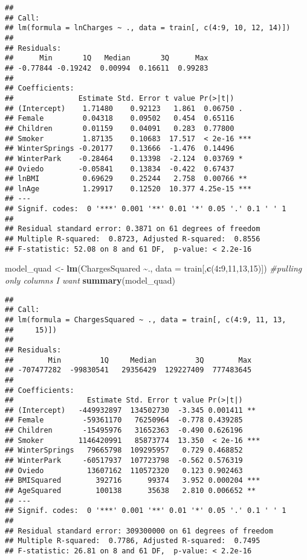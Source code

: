 \documentclass[
]{article}
\newenvironment{Shaded}{\begin{snugshade}}{\end{snugshade}}
\newcommand{\AttributeTok}[1]{\textcolor[rgb]{0.13,0.29,0.53}{#1}}
\newcommand{\CommentTok}[1]{\textcolor[rgb]{0.56,0.35,0.01}{\textit{#1}}}
\newcommand{\DecValTok}[1]{\textcolor[rgb]{0.00,0.00,0.81}{#1}}
\newcommand{\FunctionTok}[1]{\textcolor[rgb]{0.13,0.29,0.53}{\textbf{#1}}}
\newcommand{\NormalTok}[1]{#1}
\newcommand{\OtherTok}[1]{\textcolor[rgb]{0.56,0.35,0.01}{#1}}
\newcommand{\SpecialCharTok}[1]{\textcolor[rgb]{0.81,0.36,0.00}{\textbf{#1}}}
\begin{document}
\begin{verbatim}
## 
## Call:
## lm(formula = lnCharges ~ ., data = train[, c(4:9, 10, 12, 14)])
## 
## Residuals:
##      Min       1Q   Median       3Q      Max 
## -0.77844 -0.19242  0.00994  0.16611  0.99283 
## 
## Coefficients:
##               Estimate Std. Error t value Pr(>|t|)    
## (Intercept)    1.71480    0.92123   1.861  0.06750 .  
## Female         0.04318    0.09502   0.454  0.65116    
## Children       0.01159    0.04091   0.283  0.77800    
## Smoker         1.87135    0.10683  17.517  < 2e-16 ***
## WinterSprings -0.20177    0.13666  -1.476  0.14496    
## WinterPark    -0.28464    0.13398  -2.124  0.03769 *  
## Oviedo        -0.05841    0.13834  -0.422  0.67437    
## lnBMI          0.69629    0.25244   2.758  0.00766 ** 
## lnAge          1.29917    0.12520  10.377 4.25e-15 ***
## ---
## Signif. codes:  0 '***' 0.001 '**' 0.01 '*' 0.05 '.' 0.1 ' ' 1
## 
## Residual standard error: 0.3871 on 61 degrees of freedom
## Multiple R-squared:  0.8723, Adjusted R-squared:  0.8556 
## F-statistic: 52.08 on 8 and 61 DF,  p-value: < 2.2e-16
\end{verbatim}

\begin{Shaded}
\begin{Highlighting}[]
\NormalTok{model\_quad }\OtherTok{\textless{}{-}} \FunctionTok{lm}\NormalTok{(ChargesSquared }\SpecialCharTok{\textasciitilde{}}\NormalTok{., }\AttributeTok{data =}\NormalTok{ train[,}\FunctionTok{c}\NormalTok{(}\DecValTok{4}\SpecialCharTok{:}\DecValTok{9}\NormalTok{,}\DecValTok{11}\NormalTok{,}\DecValTok{13}\NormalTok{,}\DecValTok{15}\NormalTok{)]) }\CommentTok{\#pulling only columns I want}
\FunctionTok{summary}\NormalTok{(model\_quad)}
\end{Highlighting}
\end{Shaded}

\begin{verbatim}
## 
## Call:
## lm(formula = ChargesSquared ~ ., data = train[, c(4:9, 11, 13, 
##     15)])
## 
## Residuals:
##        Min         1Q     Median         3Q        Max 
## -707477282  -99830541   29356429  129227409  777483645 
## 
## Coefficients:
##                 Estimate Std. Error t value Pr(>|t|)    
## (Intercept)   -449932897  134502730  -3.345 0.001411 ** 
## Female         -59361170   76250964  -0.778 0.439285    
## Children       -15495976   31652363  -0.490 0.626196    
## Smoker        1146420991   85873774  13.350  < 2e-16 ***
## WinterSprings   79665798  109295957   0.729 0.468852    
## WinterPark     -60517937  107723798  -0.562 0.576319    
## Oviedo          13607162  110572320   0.123 0.902463    
## BMISquared        392716      99374   3.952 0.000204 ***
## AgeSquared        100138      35638   2.810 0.006652 ** 
## ---
## Signif. codes:  0 '***' 0.001 '**' 0.01 '*' 0.05 '.' 0.1 ' ' 1
## 
## Residual standard error: 309300000 on 61 degrees of freedom
## Multiple R-squared:  0.7786, Adjusted R-squared:  0.7495 
## F-statistic: 26.81 on 8 and 61 DF,  p-value: < 2.2e-16
\end{verbatim}
\end{document}
